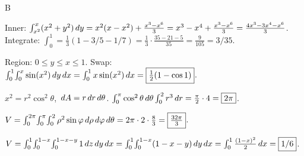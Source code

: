 \documentclass[11pt]{article}
\begin{document}
\begin{answers}{B}
\item Inner: $\int_{x^2}^x (x^2 + y^2) \,dy = x^2(x - x^2) + \tfrac{x^3 - x^6}{3} = x^3 - x^4 + \tfrac{x^3 - x^6}{3} = \tfrac{4x^3 - 3x^4 - x^6}{3}$. Integrate: $\int_0^1 = \tfrac{1}{3}(1 - 3/5 - 1/7) = \tfrac{1}{3} \cdot \tfrac{35 - 21 - 5}{35} = \tfrac{9}{105} = \boxed{3/35}$.
\item Region: $0 \le y \le x \le 1$. Swap: $\int_0^1\!\int_0^x \sin(x^2) \,dy \,dx = \int_0^1 x \sin(x^2) \,dx = \boxed{\tfrac{1}{2}(1 - \cos 1)}$.
\item $x^2 = r^2 \cos^2\theta$, $\,dA = r \,dr \,d\theta$. $\int_0^\pi \cos^2\theta \,d\theta \int_0^2 r^3 \,dr = \tfrac{\pi}{2} \cdot 4 = \boxed{2\pi}$.
\item $V = \int_0^{2\pi}\!\int_0^\pi\!\int_0^2 \rho^2 \sin\varphi \,d\rho \,d\varphi \,d\theta = 2\pi \cdot 2 \cdot \tfrac{8}{3} = \boxed{\tfrac{32\pi}{3}}$.
\item $V = \int_0^1\!\int_0^{1-x}\!\int_0^{1-x-y} 1 \,dz \,dy \,dx = \int_0^1 \!\int_0^{1-x}(1-x-y) \,dy \,dx = \int_0^1 \tfrac{(1-x)^2}{2} \,dx = \boxed{1/6}$.
\end{answers}
\end{document}
